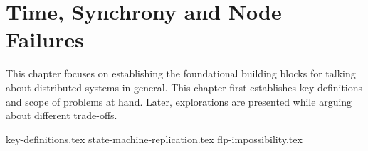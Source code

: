\chapter{Time, Synchrony and Node Failures}

This chapter focuses on establishing the foundational building blocks for talking about distributed systems in general. This chapter first establishes key definitions and scope of problems at hand. Later, explorations are presented while arguing about different trade-offs.

{key-definitions.tex}
{state-machine-replication.tex}
{flp-impossibility.tex}